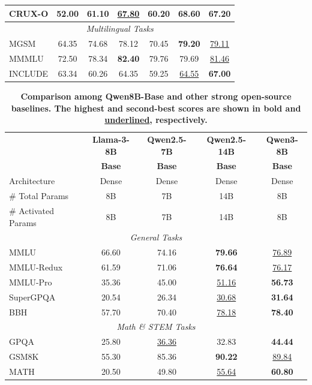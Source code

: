 \documentclass[dvipsnames]{article}
\begin{document}
\begin{table}[tbp]
{\begin{tabular}{@{}lcccccc@{}}
CRUX-O & 52.00 & 61.10 & \underline{67.80} & 60.20 & \textbf{68.60} & 67.20 \\
\midrule
\multicolumn{7}{c}{\textit{Multilingual Tasks}} \\
\midrule
MGSM & 64.35 & 74.68 & 78.12 & 70.45 & \textbf{79.20} & \underline{79.11} \\
MMMLU & 72.50 & 78.34 & \textbf{82.40} & 79.76 & 79.69 & \underline{81.46} \\
INCLUDE & 63.34 & 60.26 & 64.35 & 59.25 & \underline{64.55} & \textbf{67.00} \\
\bottomrule
\end{tabular}
}
\end{table}

\begin{table}[tbp]
\centering
\caption{\textbf{Comparison among Qwen8B-Base and other strong open-source baselines. The highest and second-best scores are shown in \textbf{bold} and \underline{underlined}, respectively.}}
\label{tab:base-8B}
\small
\begin{tabular}{@{}lcccc@{}}
\toprule
 & \textbf{Llama-3-8B} & \textbf{Qwen2.5-7B} & \textbf{Qwen2.5-14B}  & \textbf{Qwen3-8B} \\
&   \textbf{Base} & \textbf{Base} & \textbf{Base} & \textbf{Base} \\
\midrule
Architecture & Dense & Dense & Dense & Dense\\
\# Total Params & 8B & 7B & 14B & 8B \\
\# Activated Params & 8B & 7B & 14B & 8B \\
\midrule
\multicolumn{5}{c}{\textit{General Tasks}} \\
\midrule
MMLU & 66.60 & 74.16 & \textbf{79.66} & \underline{76.89}  \\
MMLU-Redux & 61.59 & 71.06 & \textbf{76.64} & \underline{76.17}  \\
MMLU-Pro & 35.36 & 45.00 &  \underline{51.16} & \textbf{56.73}  \\
SuperGPQA & 20.54 & 26.34 & \underline{30.68} & \textbf{31.64}  \\
BBH & 57.70 & 70.40 & \underline{78.18} & \textbf{78.40} \\
\midrule
\multicolumn{5}{c}{\textit{Math \& STEM Tasks}} \\
\midrule
GPQA & 25.80 & \underline{36.36} & 32.83 & \textbf{44.44} \\
GSM8K & 55.30 & 85.36 & \textbf{90.22} & \underline{89.84} \\
MATH & 20.50 & 49.80 & \underline{55.64} & \textbf{60.80}  \\

\end{tabular}
\end{table}
\end{document}
